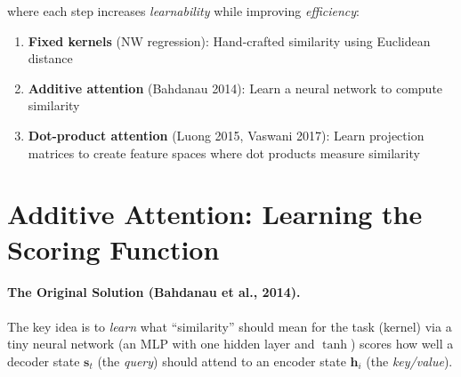 \documentclass{article}
\begin{document}
\begin{center}
\end{center}
where each step increases \textit{learnability} while improving \textit{efficiency}:
\begin{enumerate}
    \item \textbf{Fixed kernels} (NW regression): Hand-crafted similarity using Euclidean distance
    \item \textbf{Additive attention} (Bahdanau 2014): Learn a neural network to compute similarity
    \item \textbf{Dot-product attention} (Luong 2015, Vaswani 2017): Learn projection matrices to create feature spaces where dot products measure similarity
\end{enumerate}


\section{Additive Attention: Learning the Scoring Function}

\paragraph{The Original Solution (Bahdanau et al., 2014).}
The key idea is to \emph{learn} what ``similarity'' should mean for the task (kernel) via a tiny neural network (an MLP with one hidden layer and $\tanh$) scores how well a decoder state $\bm{s}_t$ (the \emph{query}) should attend to an encoder state $\bm{h}_i$ (the \emph{key/value}).
\end{document}
